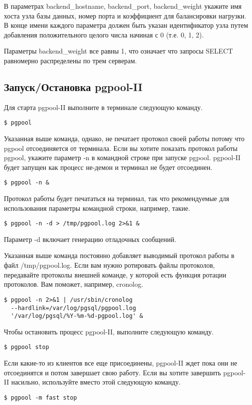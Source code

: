 В параметрах backend\_hostname, backend\_port, backend\_weight укажите имя хоста узла базы данных, номер порта и 
коэффициент для балансировки нагрузки. В конце имени каждого параметра должен быть указан идентификатор узла путем 
добавления положительного целого числа начиная с 0 (т.е. 0, 1, 2).

Параметры backend\_weight все равны 1, что означает что запросы SELECT равномерно распределены по трем серверам.

\subsection{Запуск/Остановка pgpool-II}
Для старта pgpool-II выполните в терминале следующую команду.
\begin{verbatim}
$ pgpool
\end{verbatim}

Указанная выше команда, однако, не печатает протокол своей работы потому что pgpool отсоединяется от терминала. 
Если вы хотите показать протокол работы pgpool, укажите параметр -n в командной строке при запуске pgpool. 
pgpool-II будет запущен как процесс не-демон и терминал не будет отсоединен.
\begin{verbatim}
$ pgpool -n &
\end{verbatim}

Протокол работы будет печататься на терминал, так что рекомендуемые для использования параметры командной строки, 
например, такие.
\begin{verbatim}
$ pgpool -n -d > /tmp/pgpool.log 2>&1 &
\end{verbatim}

Параметр -d включает генерацию отладочных сообщений.

Указанная выше команда постоянно добавляет выводимый протокол работы в файл /tmp/pgpool.log. Если вам нужно 
ротировать файлы протоколов, передавайте протоколы внешней команде, у которой есть функция ротации протоколов. 
Вам поможет, например, cronolog.
\begin{verbatim}
$ pgpool -n 2>&1 | /usr/sbin/cronolog
  --hardlink=/var/log/pgsql/pgpool.log
  '/var/log/pgsql/%Y-%m-%d-pgpool.log' &
\end{verbatim}

Чтобы остановить процесс pgpool-II, выполните следующую команду.
\begin{verbatim}
$ pgpool stop
\end{verbatim}

Если какие-то из клиентов все еще присоединены, pgpool-II ждет пока они не отсоединятся и потом завершает свою работу. 
Если вы хотите завершить pgpool-II насильно, используйте вместо этой следующую команду.
\begin{verbatim}
$ pgpool -m fast stop
\end{verbatim}

